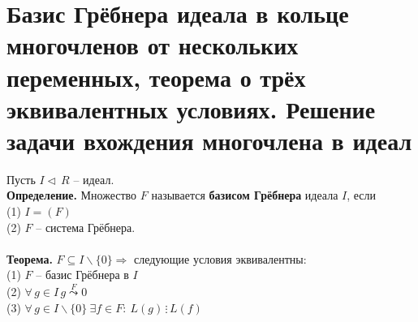 \section{Базис Грёбнера идеала в кольце многочленов от нескольких переменных, теорема о трёх эквивалентных условиях. Решение задачи вхождения многочлена в идеал}

Пусть $I \triangleleft\, R$ -- идеал.\\
\textbf{Определение.} Множество $F$ называется \textbf{базисом Грёбнера} идеала $I$, если \\
\indent (1) $I = (F)$ \\
\indent (2) $F$ -- система Грёбнера. \\\\
\textbf{Теорема.} $F \subseteq I \backslash \{0\} \Rightarrow$ следующие условия эквивалентны: \\
\indent (1) $F$ -- базис Грёбнера в $I$ \\
\indent (2) $\forall\, g \in I\, g \overset{F}{\leadsto}0$ \\
\indent (3)  $\forall\, g \in I \backslash \{0\}\ \exists f \in F:\ L(g)\, \vdots\, L(f)$
